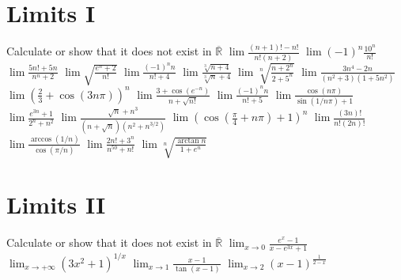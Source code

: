 \documentclass[12pt]{article}
\begin{document}
\section{Limits I}
\begin{ExerciseList}
	\Exercise Calculate or show that it does not exist in $\overline{\mathbb R}$
	\Question $\lim \frac{(n+1)!-n!}{n!(n+2)}$
	\Question $\lim (-1)^n \frac{10^n}{n!}$
	\Question $\lim \frac{5n!+5n}{n^n + 2}$
	\Question $\lim \sqrt{\frac{e^n+2}{n!}}$
	\Question $\lim \frac{(-1)^n n}{n!+4}$
	\Question $\lim \frac{\sqrt[3]{n+4}}{\sqrt[3]{n}+4}$
	\Question $\lim \sqrt[n]{\frac{n+2^n}{2+5^n}}$
	\Question $\lim \frac{3n^4-2n}{(n^2 + 3)(1+5n^2)}$
	\Question $\lim (\frac{2}{3}+\cos(3n\pi))^n$
	\Question $\lim \frac{3+\cos(e^{-n})}{n+\sqrt{n!}}$
	\Question $\lim \frac{(-1)^n n }{n! + 5}$
	\Question $\lim \frac{\cos{(n\pi)}}{\sin{(1/n\pi)}+1}$
	\Question $\lim \frac{e^{3n}+1}{2^n+n^2}$
	\Question $\lim \frac{\sqrt{n} + n^3}{(n+\sqrt{n})(n^2 + n^{3/2})}$
	\Question $\lim (\cos{(\frac{\pi}{4}+n\pi)}+1)^n$
	\Question $\lim \frac{(3n)!}{n!(2n)!}$
	\Question $\lim \frac{\arccos(1/n)}{\cos(\pi/n)}$
	\Question $\lim \frac{2n! + 3^n}{n^{50} + n!}$
	\Question $\lim \sqrt[n]{\frac{\arctan n}{1+e^n}}$
\end{ExerciseList}

\section{Limits II}
\begin{ExerciseList}
	\Exercise Calculate or show that it does not exist in $\overline{\mathbb R}$
	\Question $\lim_{x\to 0}\frac{e^x - 1}{x-e^{3x} + 1}$
	\Question $\lim_{x\to +\infty}(3x^2+1)^{1/x}$
	\Question $\lim_{x\to 1}\frac{x-1}{\tan(x-1)}$
	\Question $\lim_{x\to 2}(x-1)^{\frac{1}{2-x}}$
\end{ExerciseList}
\end{document}
